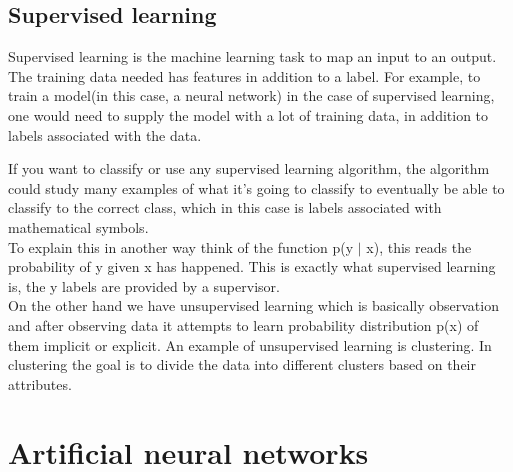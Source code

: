 \subsection{Supervised learning}
% 

Supervised learning is the machine learning task to map an input to an output. The training data needed has features in addition to a label. For example, to train a model(in this case, a neural network) in the case of supervised learning, one would need to supply the model with a lot of training data, in addition to labels associated with the data. %

If you want to classify or use any supervised learning algorithm, the algorithm could study many examples of what it's going to classify to eventually be able to classify to the correct class, which in this case is labels associated with mathematical symbols.\\ To explain this in another way think of the function p(y $|$ x), this reads the probability of y given x has happened. This is exactly what supervised learning is, the y labels are provided by a supervisor.\\

On the other hand we have unsupervised learning which is basically observation and after observing data it attempts to learn probability distribution p(x) of them implicit or explicit. An example of unsupervised learning is clustering. In clustering the goal is to divide the data into different clusters based on their attributes. \parencite{goodfellow_deep_2016}

\section{Artificial neural networks}
\label{artificial_neural_networks}
% 
% 

